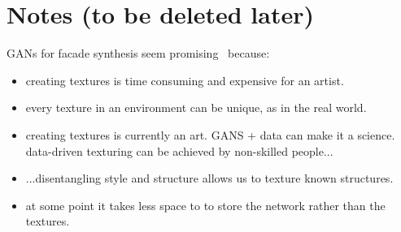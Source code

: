 




\section{Notes (to be deleted later)}

GANs for facade synthesis seem promising~\cite{pix2pix} because:
\begin{itemize}
    \item creating textures is time consuming and expensive for an artist.
    \item every texture in an environment can be unique, as in the real world.
    \item creating textures is currently an art. GANS + data can make it a science. data-driven texturing can be achieved by non-skilled people...
    \item ...disentangling style and structure allows us to texture known structures.
    \item at some point it takes less space to to store the network rather than the textures.
\end{itemize}

